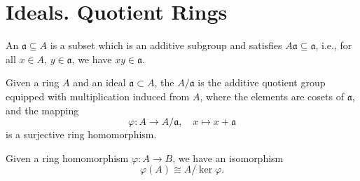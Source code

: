 


\section{Ideals. Quotient Rings}

\begin{definition}[Ideal]
    An  \( \mathfrak{a} \subseteq A \) is a subset which is an additive subgroup and satisfies \( A\mathfrak{a} \subseteq \mathfrak{a} \), i.e., for all \( x \in A \), \( y \in \mathfrak{a} \), we have \( xy \in \mathfrak{a} \).
    \end{definition}
    
    \begin{definition}
    Given a ring \( A \) and an ideal \( \mathfrak{a} \subset A \), the  \( A/\mathfrak{a} \) is the additive quotient group equipped with multiplication induced from \( A \), where the elements are cosets of \( \mathfrak{a} \), and the mapping
    \[
    \varphi: A \to A/\mathfrak{a}, \quad x \mapsto x + \mathfrak{a}
    \]
    is a surjective ring homomorphism.
    \end{definition}
    
    \begin{theorem}
        Given a ring homomorphism \( \varphi: A \to B \), we have an isomorphism
        \[
        \varphi(A) \cong A / \ker \varphi.
        \]
    \end{theorem}
    
